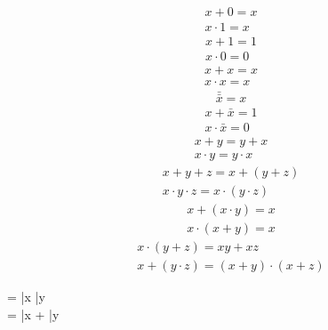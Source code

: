 
        \begin{align*}
            x + 0 = x \\
            x \cdot 1 = x
        \end{align*}
        \begin{align*}
            x + 1 = 1 \\
            x \cdot 0 = 0
        \end{align*}
        \begin{align*}
            x + x = x \\
            x \cdot x = x
        \end{align*}
        \begin{align*}
            \bar{\bar{x}} = x
        \end{align*}
        \begin{align*}
            x + \bar{x} = 1 \\
            x \cdot \bar{x} = 0
        \end{align*}
        \begin{align*}
            x + y = y + x \\
            x \cdot y = y \cdot x
        \end{align*}
        \begin{align*}
            x + y + z = x + (y + z) \\
            x \cdot y \cdot z = x \cdot (y \cdot z)
        \end{align*}
        \begin{align*}
            x + (x \cdot y) = x \\
            x \cdot (x + y) = x
        \end{align*}
        \begin{align*}
            x \cdot (y + z) = xy + xz \\
            x + (y \cdot z) = (x + y) \cdot (x + z)
        \end{align*}
        \begin{eqbox}
             = \bar{x} \cdot \bar{y} \\
             = \bar{x} + \bar{y}
        \end{eqbox}
